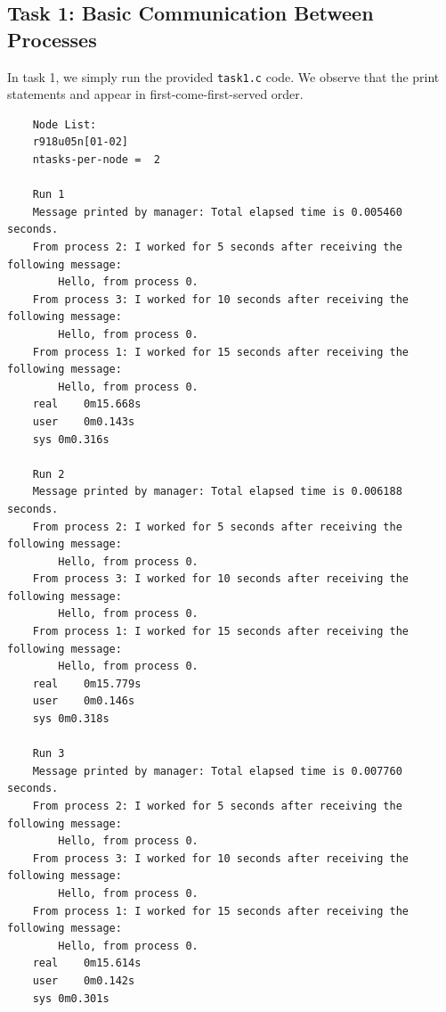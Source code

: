 \documentclass{article}
\begin{document}
\subsection{Task 1: Basic Communication Between Processes}
In task 1, we simply run the provided \texttt{task1.c} code. We observe that 
the print statements and appear in first-come-first-served order.
\begin{verbatim}
    Node List:
    r918u05n[01-02]
    ntasks-per-node =  2
    
    Run 1
    Message printed by manager: Total elapsed time is 0.005460 seconds.
    From process 2: I worked for 5 seconds after receiving the following message:
        Hello, from process 0.
    From process 3: I worked for 10 seconds after receiving the following message:
        Hello, from process 0.
    From process 1: I worked for 15 seconds after receiving the following message:
        Hello, from process 0.
    real	0m15.668s
    user	0m0.143s
    sys	0m0.316s
    
    Run 2
    Message printed by manager: Total elapsed time is 0.006188 seconds.
    From process 2: I worked for 5 seconds after receiving the following message:
        Hello, from process 0.
    From process 3: I worked for 10 seconds after receiving the following message:
        Hello, from process 0.
    From process 1: I worked for 15 seconds after receiving the following message:
        Hello, from process 0.
    real	0m15.779s
    user	0m0.146s
    sys	0m0.318s
    
    Run 3
    Message printed by manager: Total elapsed time is 0.007760 seconds.
    From process 2: I worked for 5 seconds after receiving the following message:
        Hello, from process 0.
    From process 3: I worked for 10 seconds after receiving the following message:
        Hello, from process 0.
    From process 1: I worked for 15 seconds after receiving the following message:
        Hello, from process 0.
    real	0m15.614s
    user	0m0.142s
    sys	0m0.301s
\end{verbatim}
\end{document}
